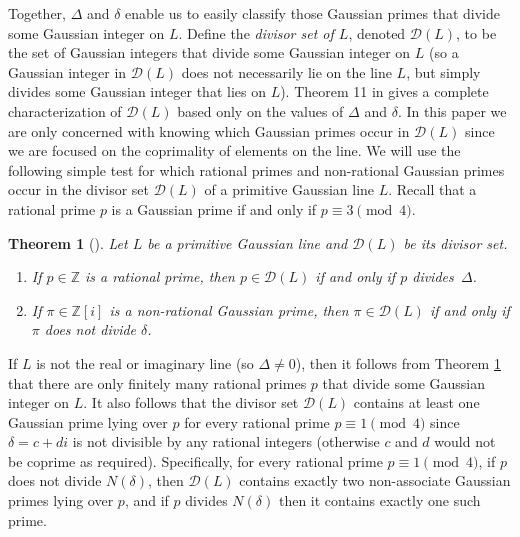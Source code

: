 \documentclass[11pt]{article}
\newtheorem{theorem}{Theorem}
\newcommand{\Z}{\mathbb{Z}}
\newcommand{\DL}{{\mathcal{D}}(L)}
\newcommand{\zi}{\Z[i]}
\begin{document}
Together, $\Delta$ and $\delta$ enable us to easily classify those Gaussian primes that divide some Gaussian integer on $L$.  
Define the {\em divisor set of $L$}, denoted $\DL$, to be the set of Gaussian integers that divide some Gaussian integer on $L$ (so a Gaussian integer in $\DL$ does not necessarily lie on the line $L$, but simply divides some Gaussian integer that lies on $L$). Theorem 11 in \cite{magness} gives a complete characterization of $\DL$ based only on the values of $\Delta$ and $\delta$. 
In this paper we are only concerned with knowing which Gaussian primes occur in $\DL$ since we are focused on the  coprimality of elements on the line.   We will use the following simple test for which rational primes and non-rational Gaussian primes occur in the divisor set $\DL$ of a primitive Gaussian line $L$. Recall that a rational prime $p$ is a Gaussian prime if and only if $p \equiv 3 \pmod 4$.


\begin{theorem}[{\cite[Theorems 4 and 5]{magness}}] \label{DL} Let  $L$ be a primitive Gaussian line and $\DL$ be its divisor set.
\begin{enumerate}
\item[(a)]  If $p\in\Z$ is a rational prime, then $p\in\DL$  if and only if $p$  divides~$\Delta$.
\item[(b)] If $\pi\in\zi$ is a non-rational Gaussian prime, then $\pi\in\DL$ if and only if $\pi$ does not divide $\delta$. 
\end{enumerate}\end{theorem}


 If $L$ is not the real or imaginary line (so $\Delta\neq 0$), then it follows from Theorem \ref{DL} that there are only finitely many rational primes $p$ that divide some Gaussian integer on $L$. It also follows  that the divisor set $\DL$ contains at least one Gaussian prime lying over $p$ for every rational prime $p\equiv 1\pmod 4$ since 
$\delta=c+di$ is not divisible by any rational integers (otherwise $c$ and $d$ would not be coprime as required).  Specifically, for every rational prime $p\equiv 1\pmod 4$, if $p$ does not divide $N(\delta)$, then $\DL$ contains exactly two non-associate Gaussian primes lying over $p$, and if $p$ divides $N(\delta)$ then it contains exactly one such prime.

\bigskip
\end{document}
